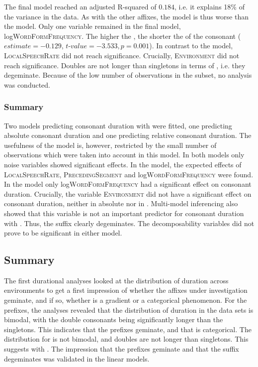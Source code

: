 The final model reached an adjusted R-squared of $0.184$, i.e. it explains 18\% of the variance in the data. As with the other affixes, the  model is thus worse than the  model. Only one variable remained in the final model, log\textsc{WordFormFrequency}. The higher the , the shorter the  of the consonant ($estimate= -0.129$, $t$-$value=-3.533, p=0.001$). In contrast to the  model, \textsc{LocalSpeechRate} did not reach significance. Crucially, \textsc{Environment} did not reach significance. Doubles are not longer than singletons in terms of , i.e. they degeminate.
Because of the low number of observations in the subset, no  analysis was conducted.

\subsubsection{Summary}
Two models predicting consonant duration with  were fitted, one predicting absolute consonant duration and one predicting relative consonant duration. The usefulness of the  model is, however,  restricted by the small number of observations which were taken into account in this model. In both models only noise variables showed significant effects. 
In the  model, the expected effects of \textsc{LocalSpeechRate}, \textsc{PrecedingSegment} and log\textsc{WordFormFrequency} were found. In the  model only log\textsc{WordFormFrequency} had a significant effect on consonant duration.
Crucially, the variable \textsc{Environment} did not have a significant effect on consonant duration, neither in absolute nor in . Multi-model inferencing also showed that this variable is not an important predictor for consonant duration with . Thus, the suffix  clearly degeminates.
The decomposability variables did not prove to be significant in either model.




\subsection{Summary} \label{Summary Corpus Study}

The first durational analyses looked at the distribution of duration across environments to get a first impression of whether the affixes under investigation geminate, and if so, whether  is a gradient or a categorical phenomenon. 
For the prefixes, the analyses revealed that the distribution of duration in the data sets is bimodal, with the double consonants being significantly longer than the singletons. This indicates that the prefixes geminate, and that  is categorical. The distribution for  is not bimodal, and doubles are not longer than singletons. This suggests  with . The impression that the prefixes geminate and that the suffix degeminates was validated in the linear models.



